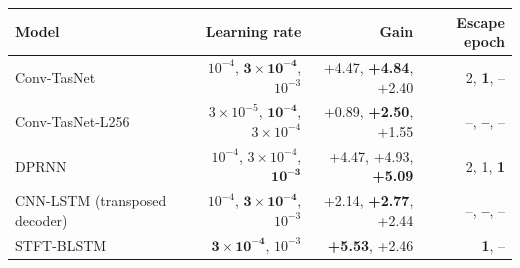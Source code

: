 \begin{tabular}{lrrr}
\toprule
Model & Learning rate & Gain & Escape epoch \\
\midrule
Conv-TasNet & $10^{-4}$, $\mathbf{3\times10^{-4}}$, $10^{-3}$ & +4.47, \textbf{+4.84}, +2.40 & 2, \textbf{1}, -- \\
Conv-TasNet-L256 & $3\times10^{-5}$, $\mathbf{10^{-4}}$, $3\times10^{-4}$ & +0.89, \textbf{+2.50}, +1.55 & --, \textbf{--}, -- \\
DPRNN & $10^{-4}$, $3\times10^{-4}$, $\mathbf{10^{-3}}$ & +4.47, +4.93, \textbf{+5.09} & 2, 1, \textbf{1} \\
CNN-LSTM (transposed decoder) & $10^{-4}$, $\mathbf{3\times10^{-4}}$, $10^{-3}$ & +2.14, \textbf{+2.77}, +2.44 & --, \textbf{--}, -- \\
STFT-BLSTM & $\mathbf{3\times10^{-4}}$, $10^{-3}$ & \textbf{+5.53}, +2.46 & \textbf{1}, -- \\
\bottomrule
\end{tabular}
